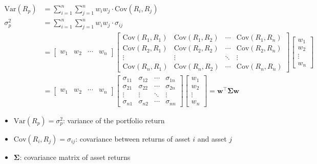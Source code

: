 \[
\begin{aligned}
\mathrm{Var}(R_p) &= \sum_{i=1}^{n} \sum_{j=1}^{n} w_i w_j \cdot \mathrm{Cov}(R_i, R_j) \\
\sigma_p^2 &= \sum_{i=1}^{n} \sum_{j=1}^{n} w_i w_j \cdot \sigma_{ij} \\
&= 
\begin{bmatrix}
  w_1 & w_2 & \cdots & w_n
\end{bmatrix}
\begin{bmatrix}
  \mathrm{Cov}(R_1, R_1) & \mathrm{Cov}(R_1, R_2) & \cdots & \mathrm{Cov}(R_1, R_n) \\
  \mathrm{Cov}(R_2, R_1) & \mathrm{Cov}(R_2, R_2) & \cdots & \mathrm{Cov}(R_2, R_n) \\
  \vdots                & \vdots                & \ddots & \vdots                \\
  \mathrm{Cov}(R_n, R_1) & \mathrm{Cov}(R_n, R_2) & \cdots & \mathrm{Cov}(R_n, R_n)
\end{bmatrix}
\begin{bmatrix}
  w_1 \\
  w_2 \\
  \vdots \\
  w_n
\end{bmatrix} \\
&= 
\begin{bmatrix}
  w_1 & w_2 & \cdots & w_n
\end{bmatrix}
\begin{bmatrix}
  \sigma_{11} & \sigma_{12} & \cdots & \sigma_{1n} \\
  \sigma_{21} & \sigma_{22} & \cdots & \sigma_{2n} \\
  \vdots      & \vdots      & \ddots & \vdots      \\
  \sigma_{n1} & \sigma_{n2} & \cdots & \sigma_{nn}
\end{bmatrix}
\begin{bmatrix}
  w_1 \\
  w_2 \\
  \vdots \\
  w_n
\end{bmatrix}
= \mathbf{w}^\top \boldsymbol{\Sigma} \mathbf{w}
\end{aligned}
\]

\begin{itemize}
  \item[] $\mathrm{Var}(R_p) = \sigma_p^2$: variance of the portfolio return  
  \item[] $\mathrm{Cov}(R_i, R_j) = \sigma_{ij}$: covariance between returns of asset $i$ and asset $j$  
  \item[] $\boldsymbol{\Sigma}$: covariance matrix of asset returns  
\end{itemize}

